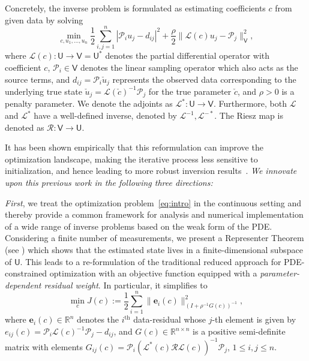 \documentclass[12pt]{amsart}
\newcommand{\V}{\mathsf{V}}
\newcommand{\yy}[1]{\textcolor{blue}{{YY: #1}}}
\begin{document}
Concretely, the inverse problem is formulated as estimating coefficients $c$ from given data by solving
\begin{equation}\label{eq:intro}
\min_{c,u_1, \ldots, u_n} {\textstyle{\frac{1}{2}}}\sum_{i,j=1}^n |\mathcal{P}_iu_j - d_{ij}|^2 +  {\textstyle{\frac{\rho}{2}}}\|\mathcal{L}(c)u_j - \mathcal{P}_j\|_\mathsf{V}^2,
\end{equation}
where $\mathcal{L}(c):\mathsf{U}\rightarrow\mathsf{V} = \mathsf{U}^*$ denotes the partial differential operator with coefficient $c$, $\mathcal{P}_i\in \V$ denotes the linear sampling operator which also acts as the source terms, and $d_{ij} = \mathcal{P}_i\check{u}_j$ represents the observed data corresponding to the underlying true state $\check{u}_j = \mathcal{L}(\check{c})^{-1}\mathcal{P}_j$ for the true parameter $\check{c}$, and $\rho > 0$ is a penalty parameter. We denote the adjoints as $\mathcal{L}^* : \mathsf{U}\rightarrow\mathsf{V}$. Furthermore, both $\mathcal{L}$ and $\mathcal{L}^*$ have a well-defined inverse, denoted by $\mathcal{L}^{-1}, \mathcal{L}^{-*}$. The Riesz map is denoted as $\mathcal{R}:\mathsf{V}\rightarrow\mathsf{U}$.

It has been shown empirically that this reformulation can improve the optimization landscape, making the iterative process less sensitive to initialization, and hence leading to more robust inversion results~\cite{van2015penalty}. \emph{We innovate upon this previous work in the following three directions:}

\emph{First}, we treat the optimization problem~\eqref{eq:intro} in the continuous setting and thereby provide a common framework for analysis and numerical implementation of a wide range of inverse problems based on the weak form of the PDE. Considering a finite number of measurements, we present a Representer Theorem (see ) which shows that the estimated state lives in a finite-dimensional subspace of $\mathsf{U}$. This leads to a re-formulation of the traditional reduced approach for PDE-constrained optimization with an objective function equipped with a \textit{parameter-dependent residual weight}. In particular, it simplifies to
\[
\min_c  J(c):={\textstyle{\frac{1}{2}}}\sum_{i=1}^n\|\mathbf{e}_i(c)\|_{(I + \rho^{-1} G(c))^{-1}}^2,
\]
where $\mathbf{e}_i(c) \in \mathbb{R}^n$ denotes the $i^\text{th}$ data-residual whose $j$-th element is given by $e_{ij}(c) = \mathcal{P}_i\mathcal{L}(c)^{-1}\mathcal{P}_j- d_{ij}$, and $G(c)\in \mathbb{R}^{n\times n}$ is a positive semi-definite matrix with elements $G_{ij}(c) = \mathcal{P}_i\left(\mathcal{L}^*(c)\mathcal{R}\mathcal{L}(c)\right)^{-1}\mathcal{P}_j$, $1\leq i,j\leq n$. %
\end{document}
